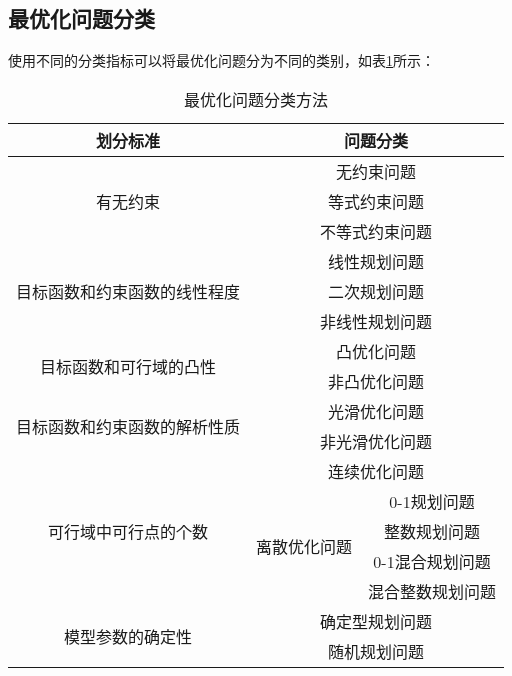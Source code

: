 \subsection{最优化问题分类}
使用不同的分类指标可以将最优化问题分为不同的类别，如表\ref{fenlei}所示：
\begin{table}[htbp]
  \centering
  \caption{最优化问题分类方法}
    \begin{tabular}{ccc}
    \toprule
    \toprule
    划分标准  & \multicolumn{2}{c}{问题分类} \\
    \midrule
    \multirow{3}[2]{*}{有无约束} & \multicolumn{2}{c}{无约束问题} \\
          & \multicolumn{2}{c}{等式约束问题} \\
          & \multicolumn{2}{c}{不等式约束问题} \\
    \midrule
    \multirow{3}[2]{*}{目标函数和约束函数的线性程度} & \multicolumn{2}{c}{线性规划问题} \\
          & \multicolumn{2}{c}{二次规划问题} \\
          & \multicolumn{2}{c}{非线性规划问题} \\
    \midrule
    \multirow{2}[2]{*}{目标函数和可行域的凸性} & \multicolumn{2}{c}{凸优化问题} \\
          & \multicolumn{2}{c}{非凸优化问题} \\
    \midrule
    \multicolumn{1}{c}{\multirow{2}[2]{*}{目标函数和约束函数的解析性质}} & \multicolumn{2}{c}{光滑优化问题} \\
          & \multicolumn{2}{c}{非光滑优化问题} \\
    \midrule
    \multirow{5}[4]{*}{可行域中可行点的个数} & \multicolumn{2}{c}{连续优化问题} \\
\cmidrule{2-3}          & \multirow{4}[2]{*}{离散优化问题} & 0-1规划问题 \\
          &       & 整数规划问题 \\
          &       & 0-1混合规划问题 \\
          &       & 混合整数规划问题 \\
    \midrule
    \multirow{2}[2]{*}{模型参数的确定性} & \multicolumn{2}{c}{确定型规划问题} \\
          & \multicolumn{2}{c}{随机规划问题} \\
    \bottomrule
    \bottomrule
	\end{tabular}%
  \label{fenlei}%
\end{table}%

